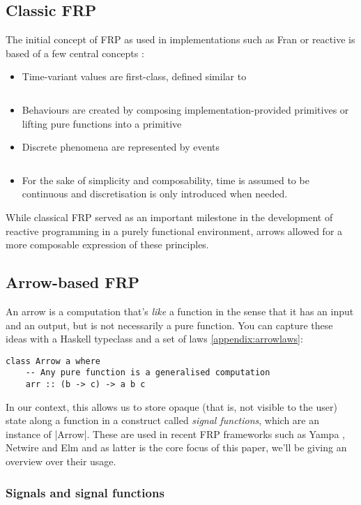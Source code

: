 \documentclass[pdftex,a4paper]{extarticle}
\begin{document}
\subsection{Classic FRP}
The initial concept of FRP as used in implementations such as Fran \cite{ElliottHudak97:Fran} or reactive \cite{haskell-wiki-reactive} is based of a few central concepts \cite{conal-what-is-frp,Elliott2009-push-pull-frp}:
\begin{itemize}
\item Time-variant values are first-class, defined similar to
\inputminted{haskell}{Behaviour.hs}
\item Behaviours are created by composing implementation-provided primitives or lifting pure functions into a primitive
\item Discrete phenomena are represented by events
\inputminted{haskell}{Event.hs}
\item For the sake of simplicity and composability, time is assumed to be continuous and discretisation is only introduced when needed.
\end{itemize}

While classical FRP served as an important milestone in the development of reactive programming in a purely functional environment, arrows allowed for a more composable expression of these principles.

\subsection{Arrow-based FRP}
An arrow is a computation that's \emph{like} a function in the sense that it has an input and an output, but is not necessarily a pure function. You can capture these ideas with a Haskell typeclass and a set of laws \ref{appendix:arrowlaws}: %
\begin{verbatim}
class Arrow a where
    -- Any pure function is a generalised computation
    arr :: (b -> c) -> a b c
\end{verbatim}
In our context, this allows us to store opaque (that is, not visible to the user) state along a function in a construct called \emph{signal functions}, which are an instance of |Arrow|.
These are used in recent FRP frameworks such as Yampa \cite{hudak2003arrows}, Netwire \cite{haskell-wiki-netwire} and Elm \cite{elm-lang} and as latter is the core focus of this paper, we'll be giving an overview over their usage.

\subsubsection{Signals and signal functions}
\begin{figure}[ht]
\centering
{}
\label{fig:sigfunc}
\end{figure}
\end{document}
